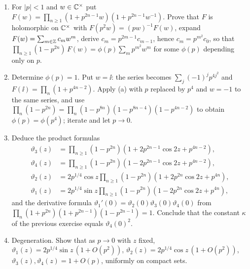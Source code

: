 \begin{exercise}
\leavevmode\par
\begin{enumerate}[label=(\alph*)]
\item For $|p|<1$ and $w\in\mathbb C^\times$ put
$F(w)=\prod_{n\ge1}(1+p^{2n-1}w)(1+p^{2n-1}w^{-1})$.  Prove that $F$ is
holomorphic on $\mathbb C^\times$ with $F(p^2w)=(pw)^{-1}F(w)$, expand
$F(w)=\sum_{m\in\mathbb Z}c_mw^m$, derive $c_m=p^{2m-1}c_{m-1}$, hence
$c_m=p^{m^2}c_0$, so that $\prod_{n\ge1}(1-p^{2n})\,F(w)=\phi(p)\sum_mp^{m^2}w^m$
for some $\phi(p)$ depending only on $p$.
\item Determine $\phi(p)=1$.  Put $w=\ii$: the series becomes
$\sum_j(-1)^jp^{4j^2}$ and $F(\ii)=\prod_n(1+p^{4n-2})$.  Apply (a) with
$p$ replaced by $p^4$ and $w=-1$ to the same series, and use
$\prod_n(1-p^{2n})=\prod_n(1-p^{8n})(1-p^{8n-4})(1-p^{4n-2})$ to obtain
$\phi(p)=\phi(p^4)$; iterate and let $p\to0$.
\item Deduce the product formulas
\begin{align*}
 \vartheta_3(z)&=\prod_{n\ge1}(1-p^{2n})(1+2p^{2n-1}\cos2z+p^{4n-2}),\\
 \vartheta_4(z)&=\prod_{n\ge1}(1-p^{2n})(1-2p^{2n-1}\cos2z+p^{4n-2}),\\
 \vartheta_2(z)&=2p^{1/4}\cos z\prod_{n\ge1}(1-p^{2n})(1+2p^{2n}\cos2z+p^{4n}),\\
 \vartheta_1(z)&=2p^{1/4}\sin z\prod_{n\ge1}(1-p^{2n})(1-2p^{2n}\cos2z+p^{4n}),
\end{align*}
and the derivative formula $\vartheta_1'(0)=\vartheta_2(0)\vartheta_3(0)\vartheta_4(0)$
from $\prod_n(1+p^{2n})(1+p^{2n-1})(1-p^{2n-1})=1$.  Conclude that the
constant $\kappa$ of the previous exercise equals $\vartheta_4(0)^2$.
\item Degeneration.  Show that as $p\to0$ with $z$ fixed,
$\vartheta_1(z)=2p^{1/4}\sin z\,(1+O(p^2))$, $\vartheta_2(z)=2p^{1/4}\cos z\,(1+O(p^2))$,
$\vartheta_3(z),\vartheta_4(z)=1+O(p)$, uniformly on compact sets.
\end{enumerate}
\end{exercise}

